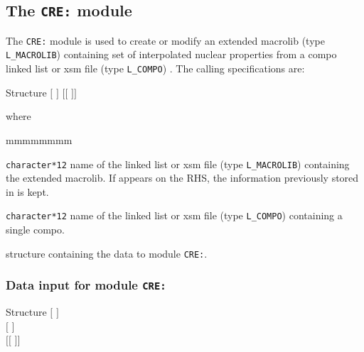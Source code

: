 \subsection{The {\tt CRE:} module}\label{sect:CREData}

The {\tt CRE:} module is used to create or modify an extended {\sc macrolib} (type {\tt L\_MACROLIB}) containing set of interpolated nuclear properties from a {\sc compo} linked list or {\sc xsm} file (type {\tt L\_COMPO}) . The calling specifications are:

\begin{DataStructure}{Structure }
 \moc{:=}  $[$  $]$ $[[$   $]]$ \moc{::} 
\end{DataStructure}

\noindent where
\begin{ListeDeDescription}{mmmmmmmm}

\item[\dusa{NAME1}] {\tt character*12} name of the linked list or {\sc xsm} file (type {\tt L\_MACROLIB}) containing the extended {\sc macrolib}. If  appears on the RHS, the information previously stored in  is kept.

\item[\dusa{NAME2}] {\tt character*12} name of the linked list or {\sc xsm} file (type {\tt L\_COMPO}) containing a single {\sc compo}.

\item[\dstr{create\_data}] structure containing the data to module {\tt CRE:}.

\end{ListeDeDescription}

\vskip 0.2cm

\subsubsection{Data input for module {\tt CRE:}}

\begin{DataStructure}{Structure }
$[$   $]$ \\
$[$   $]$ \\
 $[[$    $]]$
\end{DataStructure}

